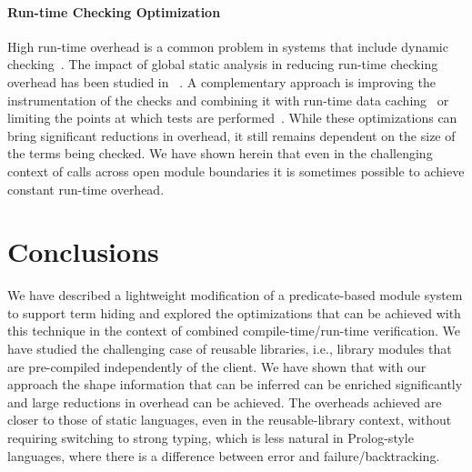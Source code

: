 \documentclass{llncs}
\begin{document}
\paragraph{Run-time Checking Optimization}%
High run-time overhead
is a common problem
in systems that
include dynamic
checking~\cite{%
  DBLP:conf/popl/TakikawaFGNVF16-short}.
%
The impact of global static analysis in reducing run-time checking
overhead has been studied in%
~\cite{optchk-ppdp2016-shorter}.
%
A complementary approach
is improving the instrumentation of the checks
and combining it with run-time data
caching~\cite{rv2014-short,cached-rtchecks-iclp2015-shorter} or limiting the points
at which %
tests are performed~\cite{testchecks-iclp09-short}.
%
While these optimizations
can bring significant reductions in overhead, it still remains
dependent on the size of the terms
being checked.
%
We have shown
herein that even in the challenging context of
calls across open module boundaries it is sometimes possible to
achieve
constant run-time overhead.


\section{Conclusions}


We have described a lightweight modification of a
predicate-based module system to support term hiding and explored the
optimizations that can be achieved with this technique in the context
of combined compile-time/run-time verification.  We have studied the
challenging case of reusable libraries, i.e., library modules that are
pre-compiled independently of the client.
%
We have shown that with our approach the shape information that can be
inferred
can be enriched significantly
and
%
large reductions in overhead can be achieved.
The overheads achieved are closer to those of
static
languages, even in the reusable-library context,
%
without requiring switching to strong typing, which is less natural
in Prolog-style languages, where there is a difference between error
and failure/backtracking.


\vspace{-1mm}




\clearpage
\appendix

\end{document}
